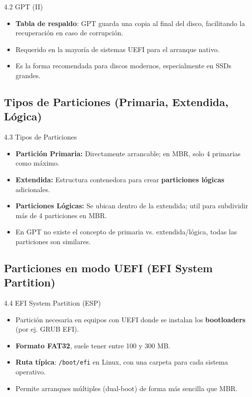 \documentclass{beamer}
\begin{document}
\begin{frame}{4.2 GPT (II)}
    \begin{itemize}
        \item \textbf{Tabla de respaldo}: GPT guarda una copia al final del disco, facilitando la recuperación en caso de corrupción.
        \item Requerido en la mayoría de sistemas UEFI para el arranque nativo.
        \item Es la forma recomendada para discos modernos, especialmente en SSDs grandes.
    \end{itemize}
\end{frame}

\subsection{Tipos de Particiones (Primaria, Extendida, Lógica)}
\begin{frame}{4.3 Tipos de Particiones}
    \begin{itemize}
        \item \textbf{Partición Primaria:} Directamente arrancable; en MBR, solo 4 primarias como máximo.
        \item \textbf{Extendida:} Estructura contenedora para crear \textbf{particiones lógicas} adicionales.
        \item \textbf{Particiones Lógicas:} Se ubican dentro de la extendida; util para subdividir más de 4 particiones en MBR.
        \item En GPT no existe el concepto de primaria vs. extendida/lógica, todas las particiones son similares.
    \end{itemize}
\end{frame}

\subsection{Particiones en modo UEFI (EFI System Partition)}
\begin{frame}{4.4 EFI System Partition (ESP)}
    \begin{itemize}
        \item Partición necesaria en equipos con UEFI donde se instalan los \textbf{bootloaders} (por ej. GRUB EFI).
        \item \textbf{Formato FAT32}, suele tener entre 100 y 300 MB.
        \item \textbf{Ruta típica}: \texttt{/boot/efi} en Linux, con una carpeta para cada sistema operativo.
        \item Permite arranques múltiples (dual-boot) de forma más sencilla que MBR.
    \end{itemize}
\end{frame}
\end{document}
